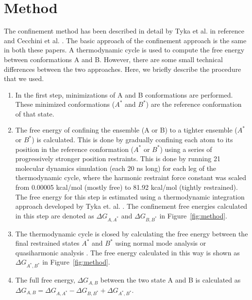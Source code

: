 \documentclass[12pt]{article}
\begin{document}
\section{Method}

The confinement method has been described in detail by Tyka et al. in reference \cite{Tyka2006} and Cecchini et al.
\cite{Cecchini2009}. The basic approach of the confinement approach is the same in both these papers. A thermodynamic
cycle is used to compute the free energy between conformations A and B. However, there are some small technical
differences between the two approaches. Here, we briefly describe the procedure that we used.

\begin{enumerate}

\item  In the first step, minimizations of A and B conformations are performed. These minimized conformations
    ($A^{\ast}$ and $B^{\ast}$) are the reference conformation of that state.

\item The free energy of confining the ensemble (A or B) to a tighter ensemble ($A^\ast$ or $B^\ast$) is calculated.
    This is done by gradually confining each atom to its position in the reference conformation ($A^{\ast}$ or
    $B^{\ast}$) using a series of progressively stronger position restraints. This is done by running 21 molecular
    dynamics simulation (each 20 ns long) for each leg of the thermodynamic cycle, where the harmonic restraint force
    constant was scaled from 0.00005 kcal/mol (mostly free) to 81.92 kcal/mol (tightly restrained). The free energy for
    this step is estimated using a thermodynamic integration approach developed by Tyka et. al. \cite{Tyka2006}. The
    confinement free energies calculated in this step are denoted as $\Delta G_{A,A^\ast}$ and $\Delta G_{B,B^\ast}$ in
    Figure~\ref{fig:method}.

\item The thermodynamic cycle is closed by calculating the free energy between the final restrained states $A^\ast$ and
    $B^\ast$ using normal mode analysis \cite{Brooks1983,Case1994} or quasiharmonic analysis
    \cite{Karplus1981,Levy1984}. The free energy calculated in this way is shown as $\Delta G_{A^\ast,B^\ast}$ in
    Figure~\ref{fig:method}.

\item  The full free energy, $\Delta G_{A,B}$ between the two state A and B is calculated as
    $\Delta G_{A,B} = \Delta G_{A,A^\ast} - \Delta G_{B,B^\ast} + \Delta G_{A^\ast,B^\ast}$.

\end{enumerate}
\end{document}
